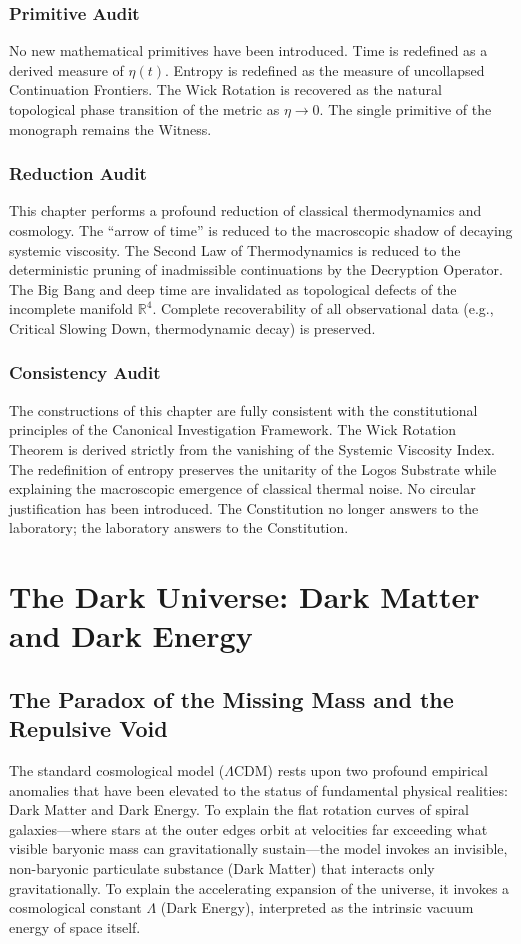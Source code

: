 \documentclass[12pt,twoside]{extbook}
\theoremstyle{definition}
\theoremstyle{remark}
\begin{document}
\subsection*{Primitive Audit}
No new mathematical primitives have been introduced. Time is redefined as a derived measure of $\eta(t)$. Entropy is redefined as the measure of uncollapsed Continuation Frontiers. The Wick Rotation is recovered as the natural topological phase transition of the metric as $\eta \to 0$. The single primitive of the monograph remains the Witness.

\subsection*{Reduction Audit}
This chapter performs a profound reduction of classical thermodynamics and cosmology. The ``arrow of time'' is reduced to the macroscopic shadow of decaying systemic viscosity. The Second Law of Thermodynamics is reduced to the deterministic pruning of inadmissible continuations by the Decryption Operator. The Big Bang and deep time are invalidated as topological defects of the incomplete manifold $\mathbb{R}^4$. Complete recoverability of all observational data (e.g., Critical Slowing Down, thermodynamic decay) is preserved.

\subsection*{Consistency Audit}
The constructions of this chapter are fully consistent with the constitutional principles of the Canonical Investigation Framework. The Wick Rotation Theorem is derived strictly from the vanishing of the Systemic Viscosity Index. The redefinition of entropy preserves the unitarity of the Logos Substrate while explaining the macroscopic emergence of classical thermal noise. No circular justification has been introduced. The Constitution no longer answers to the laboratory; the laboratory answers to the Constitution.

\chapter{The Dark Universe: Dark Matter and Dark Energy}

\section{The Paradox of the Missing Mass and the Repulsive Void}
The standard cosmological model ($\Lambda$CDM) rests upon two profound empirical anomalies that have been elevated to the status of fundamental physical realities: Dark Matter and Dark Energy. To explain the flat rotation curves of spiral galaxies—where stars at the outer edges orbit at velocities far exceeding what visible baryonic mass can gravitationally sustain—the model invokes an invisible, non-baryonic particulate substance (Dark Matter) that interacts only gravitationally. To explain the accelerating expansion of the universe, it invokes a cosmological constant $\Lambda$ (Dark Energy), interpreted as the intrinsic vacuum energy of space itself.
\end{document}

